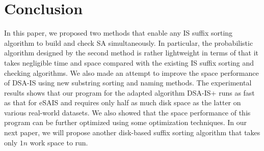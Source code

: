 \documentclass[10pt,journal,compsoc]{IEEEtran}
\begin{document}
\section{Conclusion} \label{sec:conclusion}

In this paper, we proposed two methods that enable any IS suffix sorting algorithm to build and check SA simultaneously. In particular, the probabilistic algorithm designed by the second method is rather lightweight in terms of that it takes negligible time and space compared with the existing IS suffix sorting and checking algorithms. We also made an attempt to improve the space performance of DSA-IS using new substring sorting and naming methods. The experimental results shows that our program for the adapted algorithm DSA-IS+ runs as fast as that for eSAIS and requires only half as much disk space as the latter on various real-world datasets. We also showed that the space performance of this program can be further optimized using some optimization techniques. In our next paper, we will propose another disk-based suffix sorting algorithm that takes only $1n$ work space to run.





\end{document}
